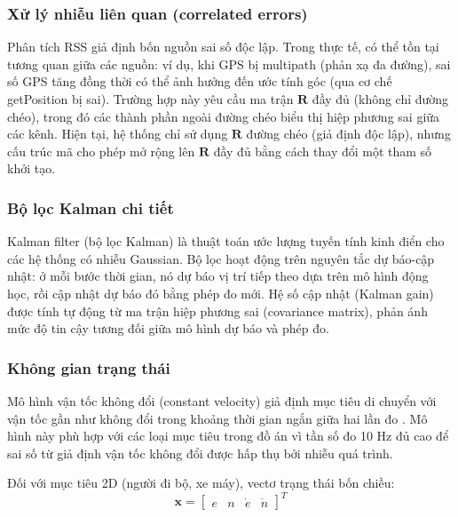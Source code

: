 \subsubsection{Xử lý nhiễu liên quan (correlated errors)}
\hspace{0.5cm} Phân tích RSS giả định bốn nguồn sai số độc lập. Trong thực tế, có thể tồn tại tương quan giữa các nguồn: ví dụ, khi GPS bị multipath (phản xạ đa đường), sai số GPS tăng đồng thời có thể ảnh hưởng đến ước tính góc (qua cơ chế getPosition bị sai). Trường hợp này yêu cầu ma trận $\mathbf{R}$ đầy đủ (không chỉ đường chéo), trong đó các thành phần ngoài đường chéo biểu thị hiệp phương sai giữa các kênh. Hiện tại, hệ thống chỉ sử dụng $\mathbf{R}$ đường chéo (giả định độc lập), nhưng cấu trúc mã cho phép mở rộng lên $\mathbf{R}$ đầy đủ bằng cách thay đổi một tham số khởi tạo.

\subsubsection{Bộ lọc Kalman chi tiết}

\hspace{0.5cm} Kalman filter (bộ lọc Kalman) là thuật toán ước lượng tuyến tính kinh điển \cite{kalman1960new} cho các hệ thống có nhiễu Gaussian. Bộ lọc hoạt động trên nguyên tắc dự báo-cập nhật: ở mỗi bước thời gian, nó dự báo vị trí tiếp theo dựa trên mô hình động học, rồi cập nhật dự báo đó bằng phép đo mới. Hệ số cập nhật (Kalman gain) được tính tự động từ ma trận hiệp phương sai (covariance matrix), phản ánh mức độ tin cậy tương đối giữa mô hình dự báo và phép đo.

\subsubsection{Không gian trạng thái}

\hspace{0.5cm} Mô hình vận tốc không đổi (constant velocity) giả định mục tiêu di chuyển với vận tốc gần như không đổi trong khoảng thời gian ngắn giữa hai lần đo \cite{barshalom2001estimation}. Mô hình này phù hợp với các loại mục tiêu trong đồ án vì tần số đo 10 Hz đủ cao để sai số từ giả định vận tốc không đổi được hấp thụ bởi nhiễu quá trình.

Đối với mục tiêu 2D (người đi bộ, xe máy), vectơ trạng thái bốn chiều:
\begin{equation}
    \mathbf{x} = \begin{bmatrix} e & n & \dot{e} & \dot{n} \end{bmatrix}^T
\end{equation}

